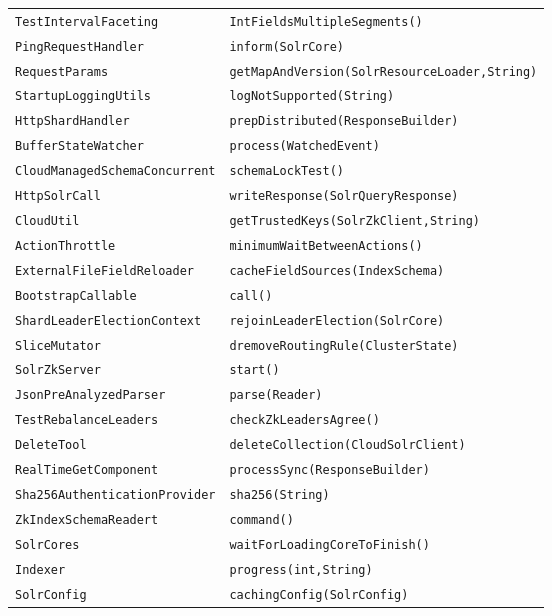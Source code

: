 \begin{center}
\begin{longtable}{ll}
 \lstinline/TestIntervalFaceting/&{\lstinline/IntFieldsMultipleSegments()/}\\
 \lstinline/PingRequestHandler/&{\lstinline/inform(SolrCore)/}\\
 \lstinline/RequestParams/&{\lstinline/getMapAndVersion(SolrResourceLoader,String)/}\\
 \lstinline/StartupLoggingUtils/&{\lstinline/logNotSupported(String)/}\\
 \lstinline/HttpShardHandler/&{\lstinline/prepDistributed(ResponseBuilder)/}\\
 \lstinline/BufferStateWatcher/&{\lstinline/process(WatchedEvent)/}\\
 \lstinline/CloudManagedSchemaConcurrent/&{\lstinline/schemaLockTest()/}\\
 \lstinline/HttpSolrCall/&{\lstinline/writeResponse(SolrQueryResponse)/}\\
 \lstinline/CloudUtil/&{\lstinline/getTrustedKeys(SolrZkClient,String)/}\\
 \lstinline/ActionThrottle/&{\lstinline/minimumWaitBetweenActions()/}\\
 \lstinline/ExternalFileFieldReloader/&{\lstinline/cacheFieldSources(IndexSchema)/}\\
 \lstinline/BootstrapCallable/&{\lstinline/call()/}\\
 \lstinline/ShardLeaderElectionContext/&{\lstinline/rejoinLeaderElection(SolrCore)/}\\
 \lstinline/SliceMutator/&{\lstinline/dremoveRoutingRule(ClusterState)/}\\
 \lstinline/SolrZkServer/&{\lstinline/start()/}\\
 \lstinline/JsonPreAnalyzedParser/&{\lstinline/parse(Reader)/}\\
 \lstinline/TestRebalanceLeaders/&{\lstinline/checkZkLeadersAgree()/}\\
 \lstinline/DeleteTool/&{\lstinline/deleteCollection(CloudSolrClient)/}\\
 \lstinline/RealTimeGetComponent/&{\lstinline/processSync(ResponseBuilder)/}\\
 \lstinline/Sha256AuthenticationProvider/&{\lstinline/sha256(String)/}\\
 \lstinline/ZkIndexSchemaReadert/&{\lstinline/command()/}\\
 \lstinline/SolrCores/&{\lstinline/waitForLoadingCoreToFinish()/}\\
 \lstinline/Indexer/&{\lstinline/progress(int,String)/}\\
 \lstinline/SolrConfig/&{\lstinline/cachingConfig(SolrConfig)/}\\

\end{longtable}
\end{center}
